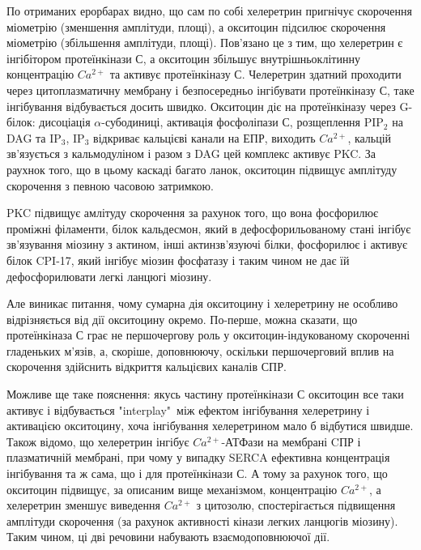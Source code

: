 \documentclass[12pt, a4paper]{article}
\begin{document}
По отриманих ерорбарах видно, що сам по собі хелеретрин пригнічує скорочення міометрію (зменшення
амплітуди, площі), а окситоцин підсилює скорочення міометрію (збільшення амплітуди, площі).
Пов'язано це з тим, що хелеретрин є інгібітором протеїнкінази С, а окситоцин
збільшує внутрішньоклітинну концентрацію $Ca^{2+}$ та активує протеїнкіназу С. Челеретрин здатний проходити через
цитоплазматичну мембрану і безпосередньо інгібувати
протеїнкіназу С, таке інгібування відбувається досить швидко. Окситоцин діє на протеїнкіназу
через G-білок: дисоціація $\alpha$-субодиниці, активація фосфоліпази С, розщеплення PIP$_2$ на
DAG та IP$_3$, IP$_3$ відкриває кальцієві канали на ЕПР, виходить $Ca^{2+}$, кальцій зв'язується
з кальмодуліном і разом з DAG цей комплекс активує PKC. За раухнок того, що в цьому каскаді
багато ланок, окситоцин підвищує амплітуду скорочення з певною часовою затримкою.

PKC підвищує амлітуду скорочення за рахунок того, що вона фосфорилює проміжні філаменти, білок
кальдесмон, який в дефосфорильованому стані інгібує зв'язування міозину з актином, інші
актинзв'язуючі білки, фосфорилює і активує білок CPI-17, який інгібує міозин
фосфатазу і таким чином не дає їй дефосфорилювати легкі ланцюгі міозину.
                                                                                
Але виникає питання, чому сумарна дія окситоцину і хелеретрину не особливо
відрізняється від дії окситоцину окремо. По-перше, можна сказати, що протеїнкіназа С грає не
першочергову роль у окситоцин-індукованому скороченні гладеньких м'язів, а,
скоріше, доповнюючу, оскільки першочерговий вплив на скорочення здійснить
відкриття кальцієвих каналів СПР.
\par
Можливе ще таке пояснення: якусь частину
протеїнкінази С окситоцин все таки активує і відбувається "interplay"\ між ефектом інгібування
хелеретрину і активацією окситоцину, хоча інгібування хелеретрином мало б
відбутися швидше. Також відомо, що хелеретрин інгібує $Ca^{2+}$-АТФази на
мембрані CПР і плазматичній мембрані, при чому у випадку SERCA ефективна концентрація інгібування та ж
сама, що і для протеїнкінази С. А тому за рахунок того, що окситоцин підвищує, за описаним
вище механізмом, концентрацію $Ca^{2+}$, а хелеретрин зменшує виведення $Ca^{2+}$ з цитозолю,
спостерігається підвищення амплітуди скорочення (за рахунок активності кінази
легких ланцюгів міозину). Таким чином, ці дві речовини набувають
взаємодоповнюючої дії.
\end{document}
